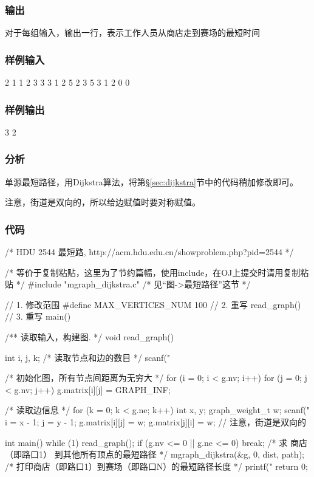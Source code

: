 \subsubsection{输出}
对于每组输入，输出一行，表示工作人员从商店走到赛场的最短时间

\subsubsection{样例输入}
\begin{Code}
2 1
1 2 3
3 3
1 2 5
2 3 5
3 1 2
0 0
\end{Code}

\subsubsection{样例输出}
\begin{Code}
3
2
\end{Code}

\subsubsection{分析}
单源最短路径，用Dijkstra算法，将第\S\ref{sec:dijkstra}节中的代码稍加修改即可。

注意，街道是双向的，所以给边赋值时要对称赋值。

\subsubsection{代码}
\begin{Codex}[label=hdu_2544.c]
/* HDU 2544 最短路, http://acm.hdu.edu.cn/showproblem.php?pid=2544 */

/* 等价于复制粘贴，这里为了节约篇幅，使用include，在OJ上提交时请用复制粘贴 */
#include "mgraph_dijkstra.c"  /* 见“图->最短路径”这节 */

// 1. 修改范围
#define MAX_VERTICES_NUM 100
// 2. 重写 read_graph()
// 3. 重写 main()

/** 读取输入，构建图. */
void read_graph() {
    int i, j, k;
    /* 读取节点和边的数目 */
    scanf("%

    /* 初始化图，所有节点间距离为无穷大 */
    for (i = 0; i < g.nv; i++) {
        for (j = 0; j < g.nv; j++) {
            g.matrix[i][j] = GRAPH_INF;
        }
    }

    /* 读取边信息 */
    for (k = 0; k < g.ne; k++) {
        int x, y;
        graph_weight_t w;
        scanf("%
        i = x - 1;
        j = y - 1;
        g.matrix[i][j] = w;
        g.matrix[j][i] = w;  // 注意，街道是双向的
    }

}

int main() {
    while (1) {
        read_graph();
        if (g.nv <= 0 || g.ne <= 0) break;
        /* 求 商店（即路口1） 到其他所有顶点的最短路径 */
        mgraph_dijkstra(&g, 0, dist, path);
        /* 打印商店（即路口1）到赛场（即路口N）的最短路径长度 */
        printf("%
    }
    return 0;
}
\end{Codex}

